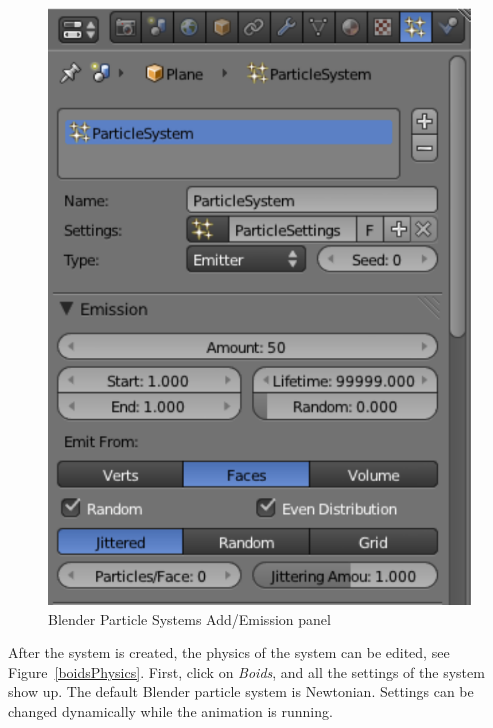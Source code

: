 \begin{figure}[htbp]
\begin{center}
\includegraphics[scale= 0.5]{figures/boidsCreatePS.pdf} 
\caption{Blender Particle Systems Add/Emission panel}
\label{boidsCreatePS}
\end{center}
\end{figure}

After the system is created, the physics of the system can be edited, see Figure~\ref{boidsPhysics}. First, click on \textit{Boids}, and all the settings of the system show up. The default Blender particle system is Newtonian. Settings can be changed dynamically while the animation is running.

